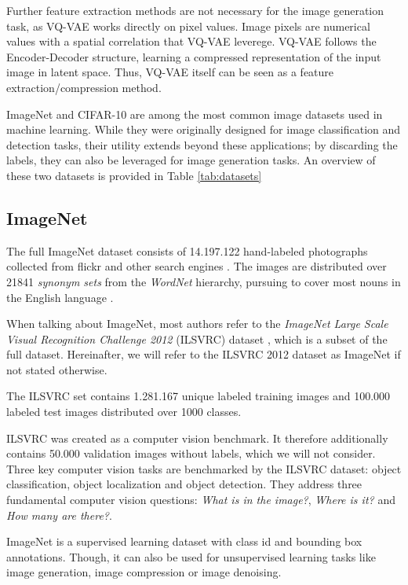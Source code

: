 \documentclass[10pt,a4paper,twoside]{article}
\begin{document}
    Further feature extraction methods are not necessary for the image generation task, as VQ-VAE works directly on pixel values. Image pixels are numerical values with a spatial correlation that VQ-VAE leverege. VQ-VAE follows the Encoder-Decoder structure, learning a compressed representation of the input image in latent space. Thus, VQ-VAE itself can be seen as a feature extraction/compression method.

    ImageNet and CIFAR-10 are among the most common image datasets used in machine learning. While they were originally designed for image classification and detection tasks, their utility extends beyond these applications; by discarding the labels, they can also be leveraged for image generation tasks. An overview of these two datasets is provided in Table \ref{tab:datasets}

    \subsection{ImageNet}
    The full ImageNet dataset consists of 14.197.122 hand-labeled photographs collected from flickr and other search engines \cite{ILSVRC15}\cite{imagenet_breakdown}. The images are distributed over 21841 \textit{synonym sets} from the \textit{WordNet} \cite{wordnet} hierarchy, pursuing to cover most nouns in the English language \cite{imagenet_breakdown}.

    When talking about ImageNet, most authors refer to the \textit{ImageNet Large Scale Visual Recognition Challenge 2012} (ILSVRC) dataset \cite{ILSVRC15}, which is a subset of the full dataset. Hereinafter, we will refer to the ILSVRC 2012 dataset as ImageNet if not stated otherwise.

    The ILSVRC set contains 1.281.167 unique labeled training images and 100.000 labeled test images distributed over 1000 classes.

    ILSVRC was created as a computer vision benchmark. It therefore additionally contains 50.000 validation images without labels, which we will not consider.
    Three key computer vision tasks are benchmarked by the ILSVRC dataset: object classification, object localization and object detection.
    They address three fundamental computer vision questions: \textit{What is in the image?}, \textit{Where is it?} and \textit{How many are there?}.

    ImageNet is a supervised learning dataset with class id and bounding box annotations. Though, it can also be used for unsupervised learning tasks like image generation, image compression or image denoising.
\end{document}
